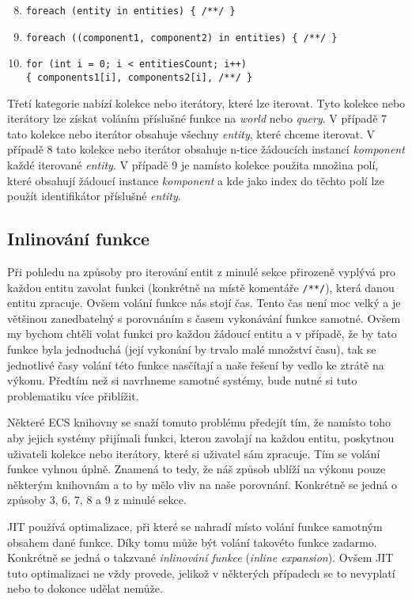 \begin{enumerate}
    \setcounter{enumi}{7}
    \item \verb|foreach (entity in entities) { /**/ }|
    \item \verb|foreach ((component1, component2) in entities) { /**/ }|
    \item \verb|for (int i = 0; i < entitiesCount; i++)|\\\verb|{ components1[i], components2[i], /**/ }|
\end{enumerate}

Třetí kategorie nabízí kolekce nebo iterátory, které lze iterovat. Tyto kolekce nebo iterátory lze získat voláním příslušné funkce na \textit{world} nebo \textit{query}. V případě 7 tato kolekce nebo iterátor obsahuje všechny \textit{entity}, které chceme iterovat. V případě 8 tato kolekce nebo iterátor obsahuje n-tice žádoucích instancí \textit{komponent} každé iterované \textit{entity}. V případě 9 je namísto kolekce použita množina polí, které obsahují žádoucí instance \textit{komponent} a kde jako index do těchto polí lze použít identifikátor příslušné \textit{entity}.

\subsection{Inlinování funkce}
Při pohledu na způsoby pro iterování entit z minulé sekce přirozeně vyplývá pro každou entitu zavolat funkci (konkrétně na místě komentáře \verb|/**/|), která danou entitu zpracuje. Ovšem volání funkce nás stojí čas. Tento čas není moc velký a je většinou zanedbatelný s porovnáním s časem vykonávání funkce samotné. Ovšem my bychom chtěli volat funkci pro každou žádoucí entitu a v případě, že by tato funkce byla jednoduchá (její vykonání by trvalo malé množství času), tak se jednotlivé časy volání této funkce nasčítají a naše řešení by vedlo ke ztrátě na výkonu. Předtím než si navrhneme samotné systémy, bude nutné si tuto problematiku více přiblížit.

Některé ECS knihovny se snaží tomuto problému předejít tím, že namísto toho aby jejich systémy přijímali funkci, kterou zavolají na každou entitu, poskytnou uživateli kolekce nebo iterátory, které si uživatel sám zpracuje. Tím se volání funkce vyhnou úplně. Znamená to tedy, že náš způsob ublíží na výkonu pouze některým knihovnám a to by mělo vliv na naše porovnání. Konkrétně se jedná o způsoby 3, 6, 7, 8 a 9 z minulé sekce.

JIT používá optimalizace, při které se nahradí místo volání funkce samotným obsahem dané funkce. Díky tomu může být volání takovéto funkce zadarmo. Konkrétně se jedná o takzvané \textit{inlinování funkce} (\textit{inline expansion}). Ovšem JIT tuto optimalizaci ne vždy provede, jelikož v některých případech se to nevyplatí nebo to dokonce udělat nemůže.

